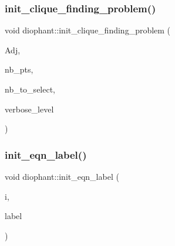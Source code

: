\subsubsection{\texorpdfstring{init\+\_\+clique\+\_\+finding\+\_\+problem()}{init\_clique\_finding\_problem()}}
{\footnotesize\ttfamily void diophant\+::init\+\_\+clique\+\_\+finding\+\_\+problem (\begin{DoxyParamCaption}\item[{\mbox{\hyperlink{galois_8h_a09fddde158a3a20bd2dcadb609de11dc}{I\+NT}} $\ast$}]{Adj,  }\item[{\mbox{\hyperlink{galois_8h_a09fddde158a3a20bd2dcadb609de11dc}{I\+NT}}}]{nb\+\_\+pts,  }\item[{\mbox{\hyperlink{galois_8h_a09fddde158a3a20bd2dcadb609de11dc}{I\+NT}}}]{nb\+\_\+to\+\_\+select,  }\item[{\mbox{\hyperlink{galois_8h_a09fddde158a3a20bd2dcadb609de11dc}{I\+NT}}}]{verbose\+\_\+level }\end{DoxyParamCaption})}

\mbox{\label{classdiophant_a34bc50b2e50d48f301081ff3269f5ba0}} 
\subsubsection{\texorpdfstring{init\+\_\+eqn\+\_\+label()}{init\_eqn\_label()}}
{\footnotesize\ttfamily void diophant\+::init\+\_\+eqn\+\_\+label (\begin{DoxyParamCaption}\item[{\mbox{\hyperlink{galois_8h_a09fddde158a3a20bd2dcadb609de11dc}{I\+NT}}}]{i,  }\item[{\mbox{\hyperlink{galois_8h_ab6cc7b4aeb6ea31aba2b3fbfc83ff5e6}{B\+Y\+TE}} $\ast$}]{label }\end{DoxyParamCaption})}

\mbox{\label{classdiophant_ae10252919a85d14368a327eb291d8f47}} 

